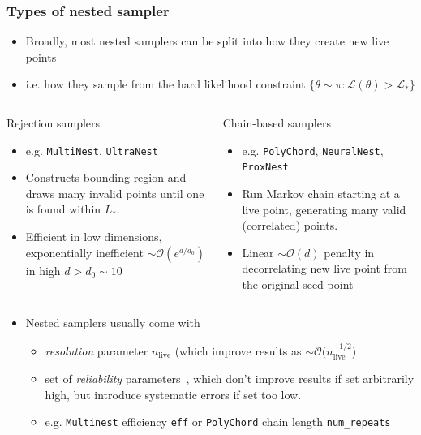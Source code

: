 \documentclass[aspectratio=169,handout]{beamer}
\begin{document}
\begin{frame}
    \frametitle{Types of nested sampler}
    \begin{itemize}
        \item Broadly, most nested samplers can be split into how they create new live points
        \item i.e. how they sample from the hard likelihood constraint $\{\theta\sim \pi : \mathcal{L}(\theta)>\mathcal{L}_* \}$
    \end{itemize}
    \vspace{-10pt}
    \begin{columns}[t]
        \begin{block}{Rejection samplers}
            \begin{itemize}
                \item e.g. \texttt{MultiNest}, \texttt{UltraNest}
                \item Constructs bounding region and draws many invalid points until one is found within $L_*$.
                \item Efficient in low dimensions, exponentially inefficient $\sim\mathcal{O}(e^{d/d_0})$ in high  $d>d_0\sim10$
            \end{itemize}
        \end{block}
        \begin{block}{Chain-based samplers}
            \begin{itemize}
                \item e.g. \texttt{PolyChord}, \texttt{NeuralNest}, \texttt{ProxNest}
                \item Run Markov chain starting at a live point, generating many valid (correlated) points.
                \item Linear $\sim\mathcal{O}(d)$ penalty in decorrelating new live point from the original seed point
            \end{itemize}
        \end{block}
    \end{columns}
    \vspace{15pt}
    \begin{itemize}
        \item Nested samplers usually come with 
            \begin{itemize}
                \item \emph{resolution} parameter $n_\mathrm{live}$ (which improve results as $\sim\mathcal{O}(n_\mathrm{live}^{-1/2}$)
                    \item set of \emph{reliability} parameters~, which don't improve results if set arbitrarily high, but introduce systematic errors if set too low.
                \item e.g. \texttt{Multinest} efficiency \texttt{eff} or \texttt{PolyChord} chain length \texttt{num\_repeats}
            \end{itemize}
    \end{itemize}
\end{frame}
\end{document}
